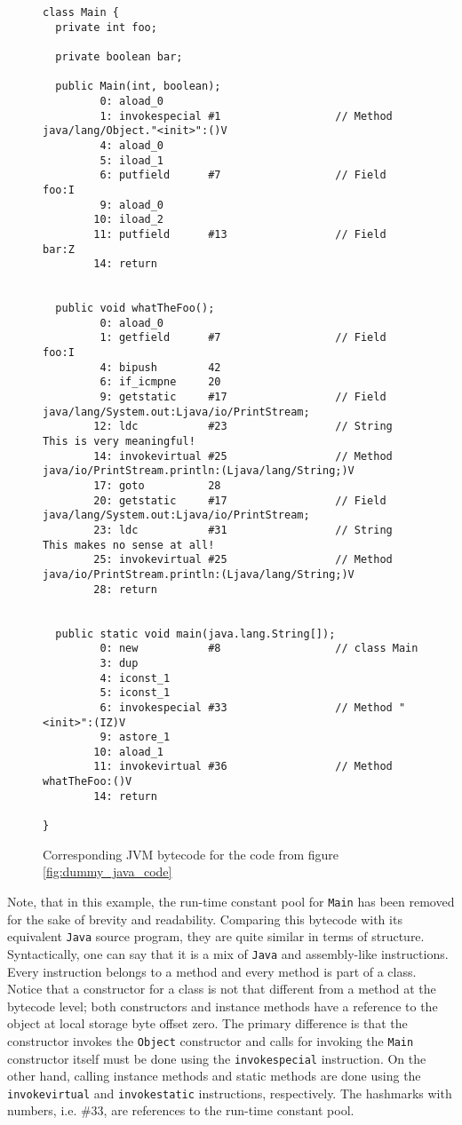 \begin{figure}[H]
\centering 
\begin{lstlisting}
class Main {
  private int foo;

  private boolean bar;

  public Main(int, boolean);
         0: aload_0
         1: invokespecial #1                  // Method java/lang/Object."<init>":()V
         4: aload_0
         5: iload_1
         6: putfield      #7                  // Field foo:I
         9: aload_0
        10: iload_2
        11: putfield      #13                 // Field bar:Z
        14: return


  public void whatTheFoo();
         0: aload_0
         1: getfield      #7                  // Field foo:I
         4: bipush        42
         6: if_icmpne     20
         9: getstatic     #17                 // Field java/lang/System.out:Ljava/io/PrintStream;
        12: ldc           #23                 // String This is very meaningful!
        14: invokevirtual #25                 // Method java/io/PrintStream.println:(Ljava/lang/String;)V
        17: goto          28
        20: getstatic     #17                 // Field java/lang/System.out:Ljava/io/PrintStream;
        23: ldc           #31                 // String This makes no sense at all!
        25: invokevirtual #25                 // Method java/io/PrintStream.println:(Ljava/lang/String;)V
        28: return


  public static void main(java.lang.String[]);
         0: new           #8                  // class Main
         3: dup
         4: iconst_1
         5: iconst_1
         6: invokespecial #33                 // Method "<init>":(IZ)V
         9: astore_1
        10: aload_1
        11: invokevirtual #36                 // Method whatTheFoo:()V
        14: return

}
\end{lstlisting}
\caption{Corresponding JVM bytecode for the code from figure \ref{fig:dummy_java_code}}
\label{fig:dummy_bytecode}
\end{figure}

Note, that in this example, the run-time constant pool for \texttt{Main} has been removed for the sake of brevity and readability.
Comparing this bytecode with its equivalent \texttt{Java} source program, they are quite similar in terms of structure.
Syntactically, one can say that it is a mix of \texttt{Java} and assembly-like instructions. Every instruction belongs to a
method and every method is part of a class. Notice that a constructor for a class is not that different from a method at
the bytecode level; both constructors and instance methods have a reference to the object at local storage byte offset zero.
The primary difference is that the constructor invokes the \texttt{Object} constructor and calls
for invoking the \texttt{Main} constructor itself must be done using the \texttt{invokespecial} instruction. On the other
hand, calling instance methods and static methods are done using the \texttt{invokevirtual} and \texttt{invokestatic} instructions,
respectively. The hashmarks with numbers, i.e. \#33, are references to the run-time constant pool.
